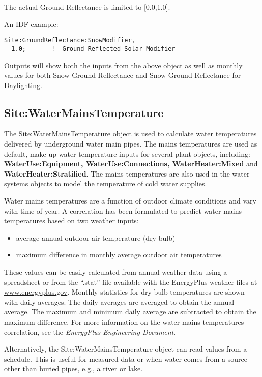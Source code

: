 The actual Ground Reflectance is limited to {[}0.0,1.0{]}.

An IDF example:

\begin{lstlisting}
Site:GroundReflectance:SnowModifier,
  1.0;       !- Ground Reflected Solar Modifier
\end{lstlisting}

Outputs will show both the inputs from the above object as well as monthly values for both Snow Ground Reflectance and Snow Ground Reflectance for Daylighting.

\subsection{Site:WaterMainsTemperature}\label{sitewatermainstemperature}

The Site:WaterMainsTemperature object is used to calculate water temperatures delivered by underground water main pipes. The mains temperatures are used as default, make-up water temperature inputs for several plant objects, including: \textbf{WaterUse:Equipment, WaterUse:Connections, WaterHeater:Mixed} and \textbf{WaterHeater:Stratified}. The mains temperatures are also used in the water systems objects to model the temperature of cold water supplies.

Water mains temperatures are a function of outdoor climate conditions and vary with time of year. A correlation has been formulated to predict water mains temperatures based on two weather inputs:

\begin{itemize}
\item
  average annual outdoor air temperature (dry-bulb)
\item
  maximum difference in monthly average outdoor air temperatures
\end{itemize}

These values can be easily calculated from annual weather data using a spreadsheet or from the ``.stat'' file available with the EnergyPlus weather files at \href{http://www.energyplus.gov}{www.energyplus.gov}. Monthly statistics for dry-bulb temperatures are shown with daily averages. The daily averages are averaged to obtain the annual average. The maximum and minimum daily average are subtracted to obtain the maximum difference. For more information on the water mains temperatures correlation, see the \emph{EnergyPlus Engineering Document}.

Alternatively, the Site:WaterMainsTemperature object can read values from a schedule. This is useful for measured data or when water comes from a source other than buried pipes, e.g., a river or lake.

